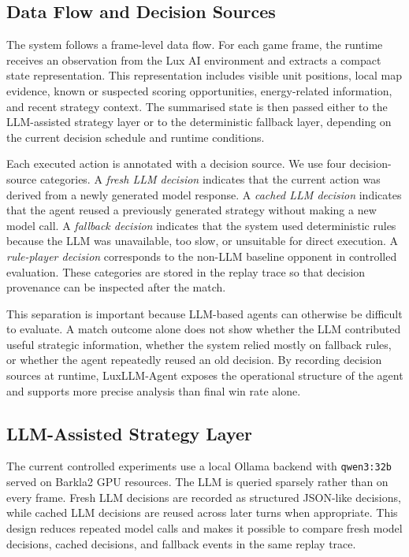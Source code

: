 \documentclass[11pt]{article}
\begin{document}
\subsection{Data Flow and Decision Sources}

The system follows a frame-level data flow. For each game frame, the runtime receives an observation from the Lux AI environment and extracts a compact state representation. This representation includes visible unit positions, local map evidence, known or suspected scoring opportunities, energy-related information, and recent strategy context. The summarised state is then passed either to the LLM-assisted strategy layer or to the deterministic fallback layer, depending on the current decision schedule and runtime conditions.

Each executed action is annotated with a decision source. We use four decision-source categories. A \emph{fresh LLM decision} indicates that the current action was derived from a newly generated model response. A \emph{cached LLM decision} indicates that the agent reused a previously generated strategy without making a new model call. A \emph{fallback decision} indicates that the system used deterministic rules because the LLM was unavailable, too slow, or unsuitable for direct execution. A \emph{rule-player decision} corresponds to the non-LLM baseline opponent in controlled evaluation. These categories are stored in the replay trace so that decision provenance can be inspected after the match.

This separation is important because LLM-based agents can otherwise be difficult to evaluate. A match outcome alone does not show whether the LLM contributed useful strategic information, whether the system relied mostly on fallback rules, or whether the agent repeatedly reused an old decision. By recording decision sources at runtime, LuxLLM-Agent exposes the operational structure of the agent and supports more precise analysis than final win rate alone.

\subsection{LLM-Assisted Strategy Layer}

The current controlled experiments use a local Ollama backend with \texttt{qwen3:32b} served on Barkla2 GPU resources. The LLM is queried sparsely rather than on every frame. Fresh LLM decisions are recorded as structured JSON-like decisions, while cached LLM decisions are reused across later turns when appropriate. This design reduces repeated model calls and makes it possible to compare fresh model decisions, cached decisions, and fallback events in the same replay trace.
\end{document}
